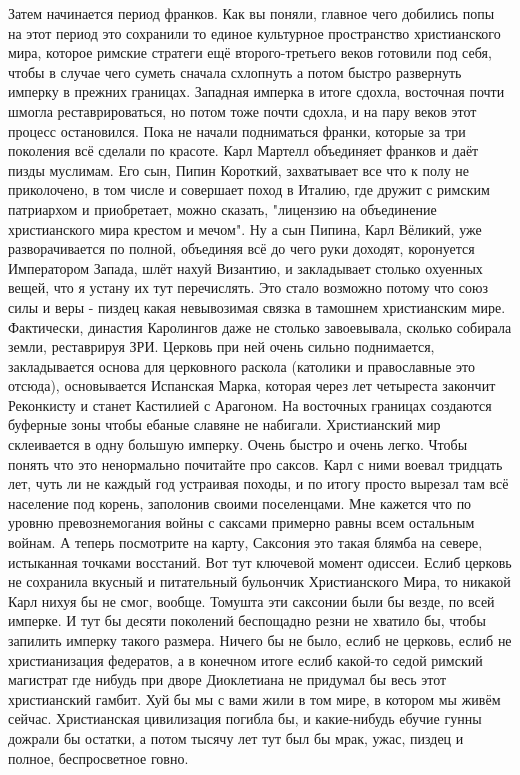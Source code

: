 Затем начинается период франков. Как вы поняли, главное чего добились попы на этот период это сохранили то единое культурное пространство христианского мира, которое римские стратеги ещё второго-третьего веков готовили под себя, чтобы в случае чего суметь сначала схлопнуть а потом быстро развернуть имперку в прежних границах. Западная имперка в итоге сдохла, восточная почти шмогла реставрироваться, но потом тоже почти сдохла, и на пару веков этот процесс остановился. Пока не начали подниматься франки, которые за три поколения всё сделали по красоте. Карл Мартелл объединяет франков и даёт пизды муслимам. Его сын, Пипин Короткий, захватывает все что к полу не приколочено, в том числе и совершает поход в Италию, где дружит с римским патриархом и приобретает, можно сказать, "лицензию на объединение христианского мира крестом и мечом". Ну а сын Пипина, Карл Вёликий, уже разворачивается по полной, объединяя всё до чего руки доходят, коронуется Императором Запада, шлёт нахуй Византию, и закладывает столько охуенных вещей, что я устану их тут перечислять. Это стало возможно потому что союз силы и веры - пиздец какая невывозимая связка в тамошнем христианским мире. 
Фактически, династия Каролингов даже не столько завоевывала, сколько собирала земли, реставрируя ЗРИ. Церковь при ней очень сильно поднимается, закладывается основа для церковного раскола (католики и православные это отсюда), основывается Испанская Марка, которая через лет четыреста закончит Реконкисту и станет Кастилией с Арагоном. На восточных границах создаются буферные зоны чтобы ебаные славяне не набигали. Христианский мир склеивается в одну большую имперку. Очень быстро и очень легко. Чтобы понять что это ненормально почитайте про саксов. Карл с ними воевал тридцать лет, чуть ли не каждый год устраивая походы, и по итогу просто вырезал там всё население под корень, заполонив своими поселенцами. Мне кажется что по уровню превознемогания войны с саксами примерно равны всем остальным войнам. А теперь посмотрите на карту, Саксония это такая блямба на севере, истыканная точками восстаний. Вот тут ключевой момент одиссеи. 
Еслиб церковь не сохранила вкусный и питательный бульончик Христианского Мира, то никакой Карл нихуя бы не смог, вообще. Томушта эти саксонии были бы везде, по всей имперке. И тут бы десяти поколений беспощадно резни не хватило бы, чтобы запилить имперку такого размера. Ничего бы не было, еслиб не церковь, еслиб не христианизация федератов, а в конечном итоге еслиб какой-то седой римский магистрат где нибудь при дворе Диоклетиана не придумал бы весь этот христианский гамбит. Хуй бы мы с вами жили в том мире, в котором мы живём сейчас. Христианская цивилизация погибла бы, и какие-нибудь ебучие гунны дожрали бы остатки, а потом тысячу лет тут был бы мрак, ужас, пиздец и полное, беспросветное говно. 

